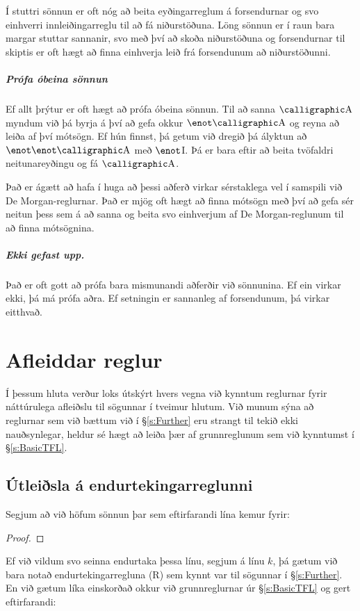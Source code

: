 Í stuttri sönnun er oft nóg að beita eyðingarreglum á forsendurnar og svo einhverri innleiðingarreglu til að fá niðurstöðuna. Löng sönnun er í raun bara margar stuttar sannanir, svo með því að skoða niðurstöðuna og forsendurnar til skiptis er oft hægt að finna einhverja leið frá forsendunum að niðurstöðunni.

\paragraph{Prófa óbeina sönnun}

Ef allt þrýtur er oft hægt að prófa óbeina sönnun. Til að sanna $\meta{A}$ myndum við þá byrja á því að gefa okkur $\enot \meta{A}$ og reyna að leiða af því mótsögn. Ef hún finnst, þá getum við dregið þá ályktun að $\enot \enot \meta{A}$ með $\enot$I. Þá er bara eftir að beita tvöfaldri neitunareyðingu og fá $\meta{A}$.

Það er ágætt að hafa í huga að þessi aðferð virkar sérstaklega vel í samspili við De Morgan-reglurnar. Það er mjög oft hægt að finna mótsögn með því að gefa sér neitun þess sem á að sanna og beita svo einhverjum af De Morgan-reglunum til að finna mótsögnina.

\paragraph{Ekki gefast upp.}
Það er oft gott að prófa bara mismunandi aðferðir við sönnunina. Ef ein virkar ekki, þá má prófa aðra. Ef setningin er sannanleg af forsendunum, þá virkar eitthvað.

\chapter{Afleiddar reglur}\label{s:Derived}

Í þessum hluta verður loks útskýrt hvers vegna við kynntum reglurnar fyrir náttúrulega afleiðslu til sögunnar í tveimur hlutum. Við munum sýna að reglurnar sem við bættum við í \S\ref{s:Further} eru strangt til tekið ekki nauðsynlegar, heldur sé hægt að leiða þær af grunnreglunum sem við kynntumst í \S\ref{s:BasicTFL}.

\section{Útleiðsla á endurtekingarreglunni}
Segjum að við höfum sönnun þar sem eftirfarandi lína kemur fyrir:
\begin{proof}
\end{proof}
Ef við vildum svo seinna endurtaka þessa línu, segjum á línu $k$, þá gætum við bara notað endurtekingarregluna (R) sem kynnt var til sögunnar í \S\ref{s:Further}. En við gætum líka einskorðað okkur við grunnreglurnar úr \S\ref{s:BasicTFL} og gert eftirfarandi:

